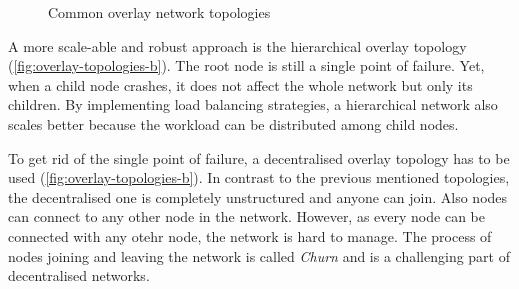 \begin{figure}[htb!]
  \centering
	\caption{Common overlay network topologies}
\label{fig:overlay-topologies}
\end{figure}

A more scale-able and robust approach is the hierarchical overlay topology (\cref{fig:overlay-topologies-b}). The root node is still a single point of failure. Yet, when a child node crashes, it does not affect the whole network but only its children. By implementing load balancing strategies, a hierarchical network also scales better because the workload can be distributed among child nodes.

To get rid of the single point of failure, a decentralised overlay topology has to be used (\cref{fig:overlay-topologies-b}). In contrast to the previous mentioned topologies, the decentralised one is completely unstructured and anyone can join. Also nodes can connect to any other node in the network. However, as every node can be connected with any otehr node, the network is hard to manage. The process of nodes joining and leaving the network is called \textit{Churn} \cite[\S1]{stutzbach_rejaie_2006} and is a challenging part of decentralised networks.
